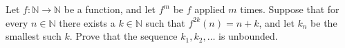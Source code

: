 Let $f: \mathbb{N} \rightarrow \mathbb{N}$ be a function, and let $f^m$ be $f$ applied $m$ times. Suppose that for every $n \in \mathbb{N}$ there exists a $k \in \mathbb{N}$ such that $f^{2k}(n)=n+k$, and let $k_n$ be the smallest such $k$. Prove that the sequence $k_1,k_2,\ldots $ is unbounded.